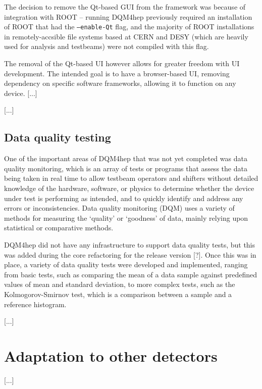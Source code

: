The decision to remove the Qt-based GUI from the framework was because of integration with ROOT -- running DQM4hep previously required an installation of ROOT that had the \texttt{--enable-Qt} flag, and the majority of ROOT installations in remotely-accsible file systems based at CERN and DESY (which are heavily used for analysis and testbeams) were not compiled with this flag. 

The removal of the Qt-based UI however allows for greater freedom with UI development. The intended goal is to have a browser-based UI, removing dependency on specific software frameworks, allowing it to function on any device. [...]

[...]

\subsection{Data quality testing}
One of the important areas of DQM4hep that was not yet completed was data quality monitoring, which is an array of tests or programs that assess the data being taken in real time to allow testbeam operators and shifters without detailed knowledge of the hardware, software, or physics to determine whether the device under test is performing as intended, and to quickly identify and address any errors or inconsistencies. Data quality monitoring (DQM) uses a variety of methods for measuring the `quality' or `goodness' of data, mainly relying upon statistical or comparative methods.

DQM4hep did not have any infrastructure to support data quality tests, but this was added during the core refactoring for the release version [?]. Once this was in place, a variety of data quality tests were developed and implemented, ranging from basic tests, such as comparing the mean of a data sample against predefined values of mean and standard deviation, to more complex tests, such as the Kolmogorov-Smirnov test, which is a comparison between a sample and a reference histogram.


[...]

\section{Adaptation to other detectors}

[...]

